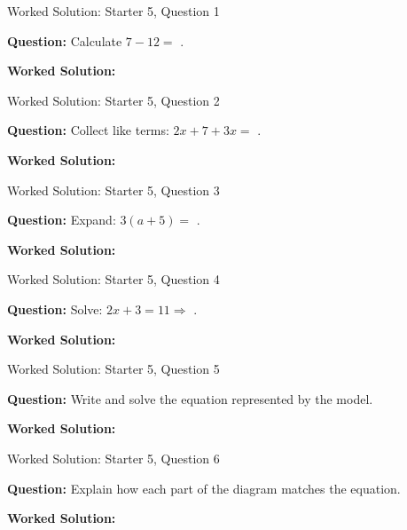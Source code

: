\documentclass{beamer}
\newcommand{\ablank}[1]{%
  \alt<2>{\textcolor{red}{#1}}{\underline{\phantom{#1}}}%
}
\newcommand{\ashow}[1]{\uncover<2->{\textcolor{red}{\small #1}}}
\begin{document}
\begin{frame}{Worked Solution: Starter 5, Question 1}
\hypertarget{work-st5}{}

\textbf{Question:} Calculate $7-12=$\ablank{$-5$}.

\textbf{Worked Solution:} \ashow{$7-12=-(12-7)=-5$.}

\end{frame}

\begin{frame}{Worked Solution: Starter 5, Question 2}

\textbf{Question:} Collect like terms: $2x+7+3x=$\ablank{$5x+7$}.

\textbf{Worked Solution:} \ashow{$2x+3x=5x$; keep $+7$: $5x+7$.}

\end{frame}

\begin{frame}{Worked Solution: Starter 5, Question 3}

\textbf{Question:} Expand: $3(a+5)=$\ablank{$3a+15$}.

\textbf{Worked Solution:} \ashow{$3(a+5)=3a+15$.}

\end{frame}

\begin{frame}{Worked Solution: Starter 5, Question 4}

\textbf{Question:} Solve: $2x+3=11 \Rightarrow$\ablank{$x=4$}.

\textbf{Worked Solution:} \ashow{Subtract $3$: $2x=8$; divide by $2$: $x=4$.}

\end{frame}

\begin{frame}{Worked Solution: Starter 5, Question 5}

\textbf{Question:} Write and solve the equation represented by the model.

\textbf{Worked Solution:} \ashow{The model shows $2x+3=13$. Subtract $3$: $2x=10$, so $x=5$.}

\end{frame}

\begin{frame}{Worked Solution: Starter 5, Question 6}

\textbf{Question:} Explain how each part of the diagram matches the equation.

\textbf{Worked Solution:} \ashow{Two $x$-blocks give $2x$, the $3$-block is the constant $3$, and the total $13$ is written above them.}

\end{frame}
\end{document}
